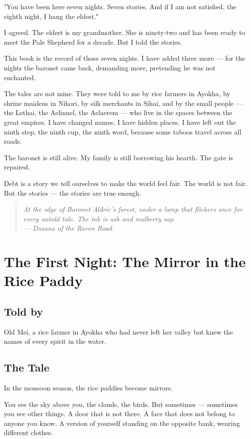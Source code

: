 \documentclass[10pt,twoside]{book}
\newcommand{\dusana}[1]{\begin{quote}\itshape #1 \\ --- Dusana of the Raven Road\end{quote}}
\begin{document}
"You have been here seven nights. Seven stories. And if I am not satisfied, the eighth night, I hang the eldest."

I agreed. The eldest is my grandmother. She is ninety-two and has been ready to meet the Pale Shepherd for a decade. But I told the stories.

This book is the record of those seven nights. I have added three more --- for the nights the baronet came back, demanding more, pretending he was not enchanted.

The tales are not mine. They were told to me by rice farmers in Ayokha, by shrine maidens in Nihori, by silk merchants in Sihai, and by the small people --- the Lethai, the Aelinnel, the Aelaerem --- who live in the spaces between the great empires. I have changed names. I have hidden places. I have left out the ninth step, the ninth cup, the ninth word, because some taboos travel across all roads.

The baronet is still alive. My family is still borrowing his hearth. The gate is repaired.

Debt is a story we tell ourselves to make the world feel fair. The world is not fair. But the stories --- the stories are true enough.

\dusana{At the edge of Baronet Aldric's forest, under a lamp that flickers once for every untold tale. The ink is ash and mulberry sap.}

\chapter{The First Night: The Mirror in the Rice Paddy}

\section*{Told by}
Old Mei, a rice farmer in Ayokha who had never left her valley but knew the names of every spirit in the water.

\section*{The Tale}
In the monsoon season, the rice paddies become mirrors.

You see the sky above you, the clouds, the birds. But sometimes --- sometimes you see other things. A door that is not there. A face that does not belong to anyone you know. A version of yourself standing on the opposite bank, wearing different clothes.
\end{document}
